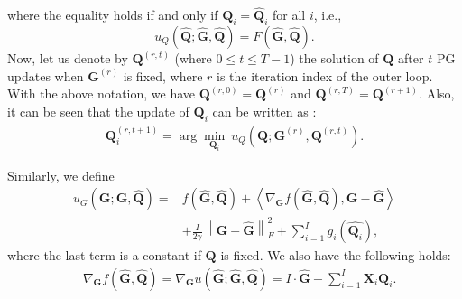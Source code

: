 \documentclass[10pt,journal]{IEEEtran}
\newcommand{\G}{\boldsymbol{G}}
\newcommand{\Q}{\boldsymbol{Q}}
\newcommand{\X}{\boldsymbol{X}}
\begin{document}
where the equality holds if and only if ${\bm Q}_i = \hat{\bm Q}_i$ for all $i$, i.e.,
\begin{equation}\label{eq:geqf}
u_Q\left(\hat{\bm Q};\hat{\bm G},\hat{\bm Q}\right) = F\left(\hat{\bm G},\hat{\bm Q}\right).
\end{equation}
Now, let us denote by ${\bm Q}^{(r,t)}$ (where $0\leq t\leq T-1$) the solution of ${\bm Q}$
after $t$ PG updates when ${\bm G}^{(r)}$ is fixed, where $r$ is the iteration index of the outer loop.
With the above notation, we have ${\bm Q}^{(r,0)}={\bm Q}^{(r)}$ and ${\bm Q}^{(r,T)}={\bm Q}^{(r+1)}$.
Also, it can be seen that the update of ${\bm Q}_i$ can be written as \cite{beck2009fast}:
\begin{equation}\label{eq:updateQ}
\begin{aligned}
	{\bm Q}_i^{(r,t+1)}= \arg\min_{{\bm Q}_i}~u_{Q}\left( {\bm Q};{\bm G}^{(r)},{\bm Q}^{(r,t)} \right).
\end{aligned}
\end{equation}


Similarly, we define
\begin{align*}
u_G\left(\G;\hat{\bm G},\hat{\bm Q}\right) = &f(\hat{\bm G},\hat{\bm Q}) + \left<\nabla_{\G} f(\hat{\bm G},\hat{\bm Q}),\G-\hat{\bm G}\right>\\
& + \frac{I}{2\gamma}\left\|\G-\hat{\G}\right\|_F^2+ \sum_{i=1}^Ig_i(\hat{\Q_i}),
\end{align*}
where the last term is a constant if $\Q$ is fixed.
We also have the following holds:
\begin{equation}\label{eq:Ggradequal}
\begin{aligned}
	&\nabla_{\G} f\left(\hat{\bm G},\hat{\bm Q}\right)=\nabla_{\G} {u}\left(\hat{\bm G};\hat{\bm G},\hat{\bm Q}\right)=I\cdot\hat{\bm G} - \sum_{i=1}^I{\X_i\Q_i}.
\end{aligned}
\end{equation}
\end{document}
